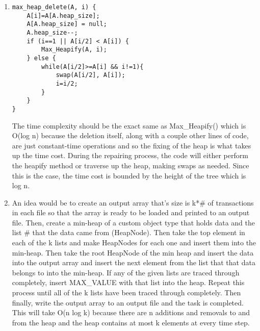 \documentclass{article}
\begin{document}
\begin{enumerate}
\item \begin{lstlisting} 
max_heap_delete(A, i) {
	A[i]=A[A.heap_size];
	A[A.heap_size] = null;
	A.heap_size--;
	if (i==1 || A[i/2] < A[i]) { 
		Max_Heapify(A, i); 
	} else {
		while(A[i/2]>=A[i] && i!=1){
			swap(A[i/2], A[i]);
			i=i/2;
		} 
	}
}
\end{lstlisting}
The time complexity should be the exact same as Max\_Heapify() which is O(log n) because the deletion itself, along with a couple other lines of code, are just constant-time operations
and so the fixing of the heap is what takes up the time cost. During the repairing process, the code will either perform the heapify method or traverse up the heap, making swaps as needed.
Since this is the case, the time cost is bounded by the height of the tree which is log n.
\item An idea would be to create an output array that's size is k*\# of transactions in each file so that the array is ready to be loaded and printed to an output file. Then, create a min-heap
	of a custom object type that holds data and the list \# that the data came from (HeapNode). Then take the top element in each of the k lists and make HeapNodes for each one and 
	insert them into the min-heap. Then take the root HeapNode of the min heap and insert the data into the output array and insert the next element from the list that that data belongs 
	to into the min-heap. If any of the given lists are traced through completely, insert MAX\_VALUE with that list into the heap. Repeat this process until all of the k lists have been traced
	through completely. Then finally, write the output array to an output file and the task is completed. This will take O(n log k) because there are n additions and removals to and from the 			heap
	and the heap contains at most k elements at every time step.
\end{enumerate}
\end{document}
